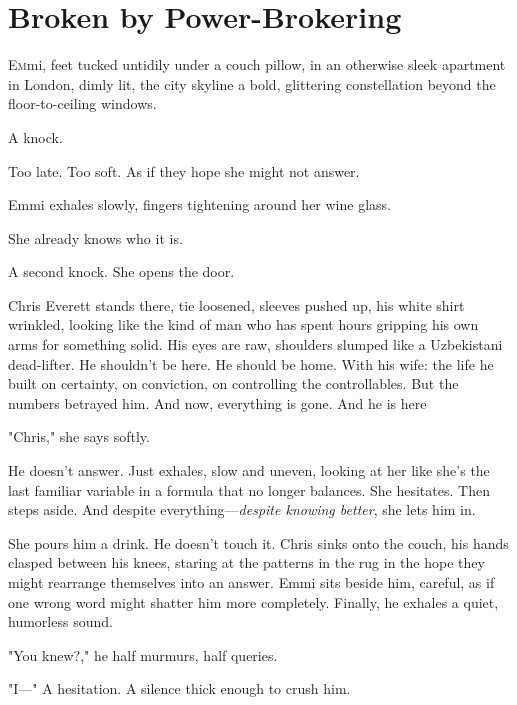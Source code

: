 \chapter*{Broken by Power-Brokering}
\lettrine{E}mmi, feet tucked untidily under a couch pillow, in an otherwise sleek apartment in London, dimly lit, the city skyline a bold, glittering constellation beyond the floor-to-ceiling windows.  
\smallskip

A knock. 

\smallskip

Too late. Too soft. As if they hope she might not answer.  

Emmi exhales slowly, fingers tightening around her wine glass. 

She already knows who it is.  

A second knock. She opens the door.  

\smallskip

Chris Everett stands there, tie loosened, sleeves pushed up, his white shirt wrinkled, looking like the kind of man who has spent hours gripping his own arms for something solid. His eyes are raw, shoulders slumped like a Uzbekistani dead-lifter. He shouldn’t be here. He should be home. With his wife: the life he built on certainty, on conviction, on controlling the controllables.  But the numbers betrayed him. And now, everything is gone. And he is here  

"Chris," she says softly.  

He doesn’t answer. Just exhales, slow and uneven, looking at her like she’s the last familiar variable in a formula that no longer balances.  She hesitates. Then steps aside. And despite everything—\textit{despite knowing better}, she lets him in.  

\smallskip

She pours him a drink. He doesn’t touch it.  Chris sinks onto the couch, his hands clasped between his knees, staring at the patterns in the rug in the hope they might rearrange themselves into an answer.  Emmi sits beside him, careful, as if one wrong word might shatter him more completely. Finally, he exhales a quiet, humorless sound.  

"You knew?," he half murmurs, half queries.  

\smallskip

"I—" A hesitation. A silence thick enough to crush him.  

\smallskip

